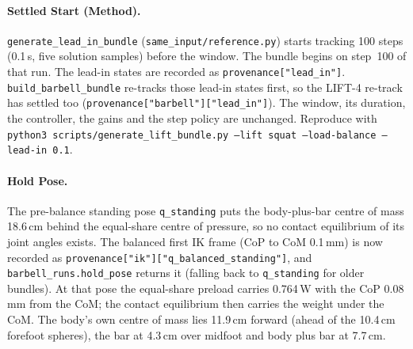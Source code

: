 \documentclass[11pt,a4paper]{article}
\begin{document}
\paragraph{Settled Start (Method).} \texttt{generate\_lead\_in\_bundle}
(\texttt{same\_input/reference.py}) starts tracking 100 steps (0.1\,s, five
solution samples) before the window. The bundle begins on step~100 of that
run. The lead-in states are recorded as \texttt{provenance["lead\_in"]}.
\texttt{build\_barbell\_bundle} re-tracks those lead-in states first, so the
LIFT-4 re-track has settled too (\texttt{provenance["barbell"]["lead\_in"]}).
The window, its duration, the controller, the gains and the step policy are
unchanged. Reproduce with \texttt{python3 scripts/generate\_lift\_bundle.py
--lift squat --load-balance --lead-in 0.1}.

\paragraph{Hold Pose.} The pre-balance standing pose \texttt{q\_standing}
puts the body-plus-bar centre of mass 18.6\,cm behind the equal-share
centre of pressure, so no contact equilibrium of its joint angles exists.
The balanced first IK frame (CoP to CoM 0.1\,mm) is now recorded as
\texttt{provenance["ik"]["q\_balanced\_standing"]}, and
\texttt{barbell\_runs.hold\_pose} returns it (falling back to
\texttt{q\_standing} for older bundles). At that pose the equal-share preload
carries 0.764\,W with the CoP 0.08\,mm from the CoM; the contact equilibrium
then carries the weight under the CoM. The body's own centre of mass lies
11.9\,cm forward (ahead of the 10.4\,cm forefoot spheres), the bar at
4.3\,cm over midfoot and body plus bar at 7.7\,cm.
\end{document}
